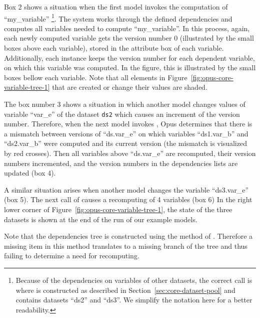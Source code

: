 {Box 2 shows a situation when the first model invokes the computation of
``my_variable'' \variablesindex \footnote{Because of the dependencies on variables of other
  datasets, the correct call is\\
   where 
  is constructed as described in Section~\ref{sec:core-dataset-pool} and contains datasets ``ds2'' and ``ds3''.
  We simplify the notation here for
  a better readability.}. The system works through the defined dependencies and
computes all variables \variablesindex needed to compute ``my_variable''. \variablesindex In this process,
again, each newly computed variable \variablesindex gets the version number 0 (illustrated by
the small boxes above each variable), \variablesindex stored in the attribute \attributesindex box of each
variable. \variablesindex Additionally, each  \variablesindex instance keeps the version
number for each dependent variable, \variablesindex on which this variable \variablesindex was computed. In
the figure, this is illustrated by the small boxes bellow each variable. \variablesindex
Note that all elements in Figure~\ref{fig:opus-core-variable-tree-1} that are
created or change their values are shaded.

The box number 3 shows a situation in which another model changes values of
variable ``var_e'' of the dataset \datasetindex \verb|ds2| which causes an increment of the
version number. Therefore, when the next model invokes
, \variablesindex Opus determines that there is a
mismatch between versions of ``ds.var_e'' on which variables \variablesindex ``ds1.var_b'' and
``ds2.var_b'' were computed and its current version (the mismatch is visualized by red crosses). Then all
variables \variablesindex above ``ds.var_e'' are recomputed, their version numbers
incremented, and the version numbers in the dependencies lists are updated
(box 4).

A similar situation arises when another model changes the variable \variablesindex
``ds3.var_e'' (box 5). The next call of
 \variablesindex causes a recomputing of 4
variables \variablesindex (box 6) In the right lower corner of
Figure~\ref{fig:opus-core-variable-tree-1}, the state of the three datasets \datasetindex is
shown at the end of the run of our example models.

Note that the dependencies tree is constructed using the
 method of . \variablesindex Therefore a missing item
in this method translates to a missing branch of the tree and thus failing to
determine a need for recomputing.

}
